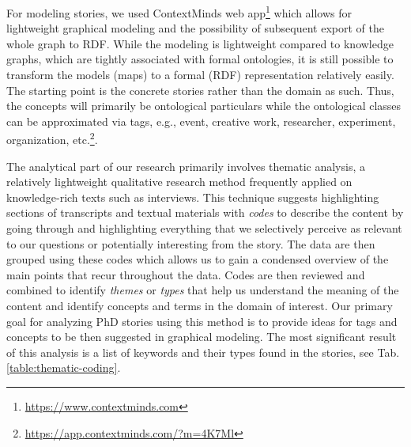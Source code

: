 \documentclass[sigconf]{acmart}
\begin{document}
For modeling stories, %
we used ContextMinds web app\footnote{\url{https://www.contextminds.com}} which allows for lightweight graphical modeling and the possibility of subsequent export of the whole graph to RDF. While the modeling is lightweight compared to knowledge graphs, which are tightly associated with formal ontologies, it is still possible to transform the models (maps) to a formal (RDF) representation relatively easily. The starting point is the concrete stories rather than the domain as such. Thus, the concepts will primarily be ontological particulars while the ontological classes can be approximated via tags, e.g., event, creative work, researcher, experiment, organization, etc.\footnote{\url{https://app.contextminds.com/?m=4K7Ml}}.


The analytical part of our research primarily involves
thematic analysis, a relatively lightweight qualitative research method frequently applied on knowledge-rich texts such as interviews. This technique suggests highlighting sections of transcripts and textual materials with \textit{codes} to describe the content by going through and highlighting everything that we selectively perceive as relevant to our questions or potentially interesting from the story. The data are then grouped using these codes which allows us to gain a condensed overview of the main points %
that recur throughout the data. Codes are then reviewed and combined to identify \textit{themes} or \textit{types} that help us understand the meaning of the content and identify concepts and terms in the domain of interest. Our primary goal for analyzing PhD stories using this method is to provide ideas for tags and concepts to be then suggested in graphical modeling. %
The most significant result of this analysis is a list of keywords and their types found in the stories, see Tab. \ref{table:thematic-coding}.%
\end{document}
